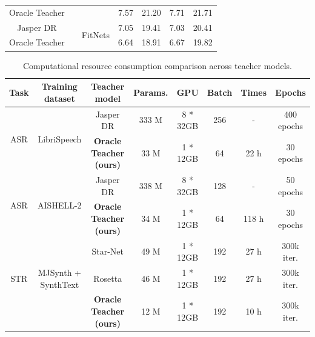 \documentclass[journal]{IEEEtran}
\begin{document}
\begin{table}[t]
{\begin{tabular}{|c|c|c|cc|cc|}
Oracle Teacher           &                              &                       & \multicolumn{1}{c|}{7.57}          & 21.20          & \multicolumn{1}{c|}{7.71}          & 21.71          \\ \cline{1-1} \cline{3-7} 
Jasper DR                &                              & \multirow{2}{*}{FitNets \cite{romero-et-al:scheme}}                      & \multicolumn{1}{c|}{7.05}          & 19.41          & \multicolumn{1}{c|}{7.03}          & 20.41          \\ \cline{1-1} \cline{4-7} 
Oracle Teacher           &                              &                    & \multicolumn{1}{c|}{6.64}          & 18.91          & \multicolumn{1}{c|}{6.67}          & 19.82          \\ \hline
\end{tabular}}
\end{table}

\begin{table}[t]
\centering
\caption{Computational resource consumption comparison across teacher models.}{%
{\fontsize{7.3}{8.76}\selectfont
\label{gpu}
\begin{tabular}{|c|c|c|c|c|c|c|c|}
\hline
Task &Training dataset& Teacher model & Params.& GPU & Batch & Times & Epochs \\
\hline
\multirow{2}{*}{ASR}&\multirow{2}{*}{LibriSpeech}&Jasper DR \cite{jasper:scheme}&333 M&8 * 32GB& 256 & - &400 epochs\\
&&\textbf{Oracle Teacher (ours)}&33 M&1 * 12GB& 64 & 22 h &30 epochs\\
\hline
\multirow{2}{*}{ASR}&\multirow{2}{*}{AISHELL-2}&Jasper DR\cite{jasper:scheme} &338 M&8 * 32GB& 128 & - &50 epochs\\
&&\textbf{Oracle Teacher (ours)}&34 M&1 * 12GB& 64 & 118 h &30 epochs\\
\hline
&&Star-Net \cite{starnet:scheme} &49 M&1 * 12GB& 192 &27 h & 300k iter.\\
STR&MJSynth + SynthText&Rosetta \cite{rosetta:scheme}&46 M&1 * 12GB& 192 &27 h& 300k iter.\\
&&\textbf{Oracle Teacher (ours)}& 12 M&1 * 12GB& 192 &10 h& 300k iter.\\
\hline
\end{tabular}%
}}
\end{table}
\end{document}
